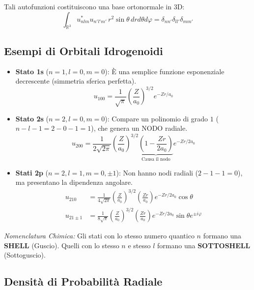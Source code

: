 \documentclass[11pt, a4paper]{article}
\begin{document}
\noindent
Tali autofunzioni costituiscono una base ortonormale in 3D: %
\begin{equation*}
    \int_{\mathbb{R}^3} u_{nlm}^* u_{n'l'm'} \, r^2 \sin\theta \, dr d\theta d\varphi = \delta_{nn'} \delta_{ll'} \delta_{mm'} %
\end{equation*}

\subsection{Esempi di Orbitali Idrogenoidi} %

\begin{itemize}
    \item \textbf{Stato 1s} ($n=1, l=0, m=0$): È una semplice funzione esponenziale decrescente (simmetria sferica perfetta). %
    \begin{equation*}
        u_{100} = \frac{1}{\sqrt{\pi}} \left(\frac{Z}{a_0}\right)^{3/2} e^{-Z r / a_0} %
    \end{equation*}
    
    \item \textbf{Stato 2s} ($n=2, l=0, m=0$): Compare un polinomio di grado $1$ ($n-l-1 = 2-0-1 = 1$), che genera un NODO radiale. %
    \begin{equation*}
        u_{200} = \frac{1}{2\sqrt{2\pi}} \left(\frac{Z}{a_0}\right)^{3/2} \underbrace{ \left(1 - \frac{Zr}{2a_0}\right) }_{\text{Causa il nodo}} e^{-Z r / 2a_0} %
    \end{equation*}

    \item \textbf{Stati 2p} ($n=2, l=1, m=0, \pm 1$): Non hanno nodi radiali ($2-1-1=0$), ma presentano la dipendenza angolare. %
    \begin{align*}
        u_{210} &= \frac{1}{4\sqrt{2\pi}} \left(\frac{Z}{a_0}\right)^{3/2} \left(\frac{Zr}{a_0}\right) e^{-Z r / 2a_0} \cos\theta \\ %
        u_{21\pm1} &= \frac{1}{8\sqrt{\pi}} \left(\frac{Z}{a_0}\right)^{3/2} \left(\frac{Zr}{a_0}\right) e^{-Z r / 2a_0} \sin\theta e^{\pm i\varphi} %
    \end{align*}
\end{itemize}

\noindent
\textit{Nomenclatura Chimica:} Gli stati con lo stesso numero quantico $n$ formano una \textbf{SHELL} (Guscio). Quelli con lo stesso $n$ e stesso $l$ formano una \textbf{SOTTOSHELL} (Sottoguscio). %

\subsection{Densità di Probabilità Radiale} %
\end{document}
